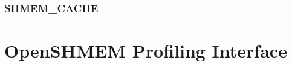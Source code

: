\documentclass[10pt]{book}
\begin{document}
\subsubsection{\textbf{SHMEM\_CACHE}}\label{subsec:shmem_cache}


\section{OpenSHMEM Profiling Interface}\label{sec:openshmem_profiling_interface}


\clearpage


\clearpage
{}
{}
\printindex
\end{document}
